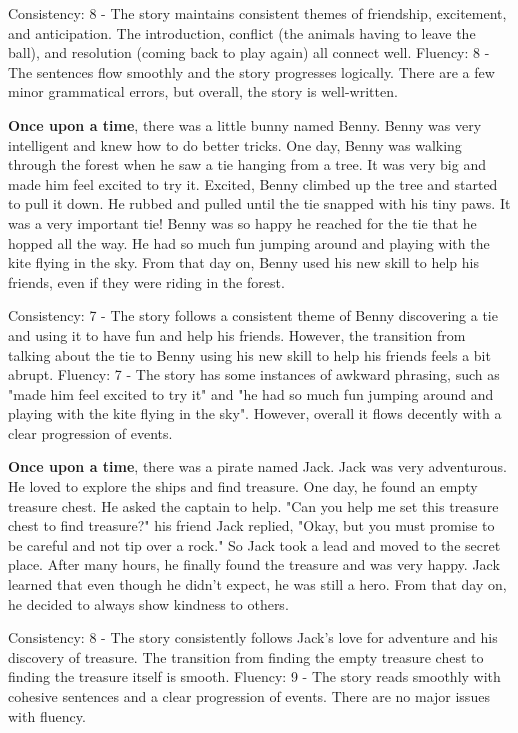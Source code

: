 \documentclass{article}
\begin{document}
Consistency: 8 - The story maintains consistent themes of friendship, excitement, and anticipation. The introduction, conflict (the animals having to leave the ball), and resolution (coming back to play again) all connect well.
Fluency: 8 - The sentences flow smoothly and the story progresses logically. There are a few minor grammatical errors, but overall, the story is well-written.

\textbf{Once upon a time}, there was a little bunny named Benny. Benny was very intelligent and knew how to do better tricks. One day, Benny was walking through the forest when he saw a tie hanging from a tree. It was very big and made him feel excited to try it. Excited, Benny climbed up the tree and started to pull it down. He rubbed and pulled until the tie snapped with his tiny paws. It was a very important tie! Benny was so happy he reached for the tie that he hopped all the way. He had so much fun jumping around and playing with the kite flying in the sky. From that day on, Benny used his new skill to help his friends, even if they were riding in the forest.

Consistency: 7 - The story follows a consistent theme of Benny discovering a tie and using it to have fun and help his friends. However, the transition from talking about the tie to Benny using his new skill to help his friends feels a bit abrupt.
Fluency: 7 - The story has some instances of awkward phrasing, such as "made him feel excited to try it" and "he had so much fun jumping around and playing with the kite flying in the sky". However, overall it flows decently with a clear progression of events.

\textbf{Once upon a time}, there was a pirate named Jack. Jack was very adventurous. He loved to explore the ships and find treasure. One day, he found an empty treasure chest. He asked the captain to help. "Can you help me set this treasure chest to find treasure?" his friend Jack replied, "Okay, but you must promise to be careful and not tip over a rock." So Jack took a lead and moved to the secret place. After many hours, he finally found the treasure and was very happy. Jack learned that even though he didn't expect, he was still a hero. From that day on, he decided to always show kindness to others.

Consistency: 8 - The story consistently follows Jack's love for adventure and his discovery of treasure. The transition from finding the empty treasure chest to finding the treasure itself is smooth.
Fluency: 9 - The story reads smoothly with cohesive sentences and a clear progression of events. There are no major issues with fluency.
\end{document}
